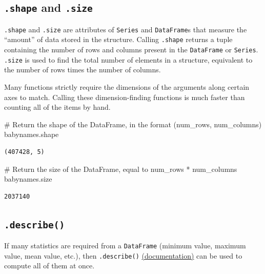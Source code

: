 \documentclass[
  letterpaper,
  DIV=11,
  numbers=noendperiod]{scrreprt}
\newenvironment{Shaded}{\begin{snugshade}}{\end{snugshade}}
\newcommand{\CommentTok}[1]{\textcolor[rgb]{0.37,0.37,0.37}{#1}}
\newcommand{\NormalTok}[1]{\textcolor[rgb]{0.00,0.23,0.31}{#1}}
\begin{document}
\subsection{\texorpdfstring{\texttt{.shape} and
\texttt{.size}}{.shape and .size}}\label{shape-and-.size}

\texttt{.shape} and \texttt{.size} are attributes of \texttt{Series} and
\texttt{DataFrame}s that measure the ``amount'' of data stored in the
structure. Calling \texttt{.shape} returns a tuple containing the number
of rows and columns present in the \texttt{DataFrame} or
\texttt{Series}. \texttt{.size} is used to find the total number of
elements in a structure, equivalent to the number of rows times the
number of columns.

Many functions strictly require the dimensions of the arguments along
certain axes to match. Calling these dimension-finding functions is much
faster than counting all of the items by hand.

\begin{Shaded}
\begin{Highlighting}[]
\CommentTok{\# Return the shape of the DataFrame, in the format (num\_rows, num\_columns)}
\NormalTok{babynames.shape}
\end{Highlighting}
\end{Shaded}

\begin{verbatim}
(407428, 5)
\end{verbatim}

\begin{Shaded}
\begin{Highlighting}[]
\CommentTok{\# Return the size of the DataFrame, equal to num\_rows * num\_columns}
\NormalTok{babynames.size}
\end{Highlighting}
\end{Shaded}

\begin{verbatim}
2037140
\end{verbatim}

\subsection{\texorpdfstring{\texttt{.describe()}}{.describe()}}\label{describe}

If many statistics are required from a \texttt{DataFrame} (minimum
value, maximum value, mean value, etc.), then \texttt{.describe()}
\href{https://pandas.pydata.org/docs/reference/api/pandas.DataFrame.describe.html}{(documentation)}
can be used to compute all of them at once.
\end{document}
